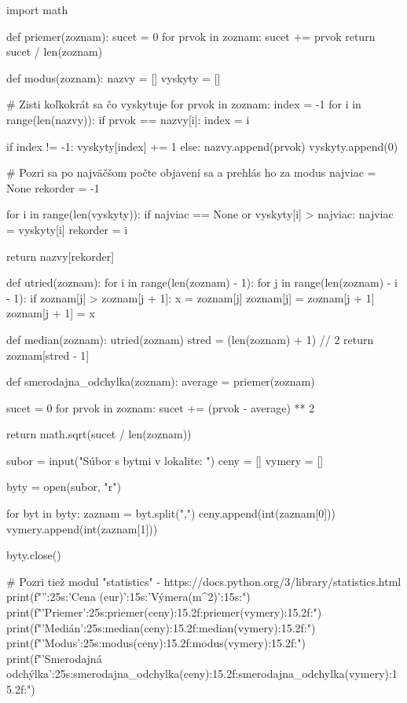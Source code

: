 \begin{solution}
import math

def priemer(zoznam):
    sucet = 0
    for prvok in zoznam:
        sucet += prvok
    return sucet / len(zoznam)

def modus(zoznam):
    nazvy = []
    vyskyty = []

    # Zisti koľkokrát sa čo vyskytuje
    for prvok in zoznam:
        index = -1
        for i in range(len(nazvy)):
            if prvok == nazvy[i]:
                index = i

        if index != -1:
            vyskyty[index] += 1
        else:
            nazvy.append(prvok)
            vyskyty.append(0)

    # Pozri sa po najväčšom počte objavení sa a prehlás ho za modus
    najviac = None
    rekorder = -1

    for i in range(len(vyskyty)):
        if najviac == None or vyskyty[i] > najviac:
            najviac = vyskyty[i]
            rekorder = i

    return nazvy[rekorder]

def utried(zoznam):
    for i in range(len(zoznam) - 1):
        for j in range(len(zoznam) - i - 1):
            if zoznam[j] > zoznam[j + 1]:
                x = zoznam[j]
                zoznam[j] = zoznam[j + 1]
                zoznam[j + 1] = x

def median(zoznam):
    utried(zoznam)
    stred = (len(zoznam) + 1) // 2
    return zoznam[stred - 1]

def smerodajna_odchylka(zoznam):
    average = priemer(zoznam)

    sucet = 0
    for prvok in zoznam:
        sucet += (prvok - average) ** 2

    return math.sqrt(sucet / len(zoznam))


subor = input("Súbor s bytmi v lokalite: ")
ceny = []
vymery = []

byty = open(subor, "r")

for byt in byty:
    zaznam = byt.split(",")
    ceny.append(int(zaznam[0]))
    vymery.append(int(zaznam[1]))

byty.close()

# Pozri tiež modul "statistics" - https://docs.python.org/3/library/statistics.html
print(f"{'':25s}:{'Cena (eur)':15s}:{'Výmera(m^2)':15s}:")
print(f"{'Priemer':25s}:{priemer(ceny):15.2f}:{priemer(vymery):15.2f}:")
print(f"{'Medián':25s}:{median(ceny):15.2f}:{median(vymery):15.2f}:")
print(f"{'Modus':25s}:{modus(ceny):15.2f}:{modus(vymery):15.2f}:")
print(f"{'Smerodajná odchýlka':25s}:{smerodajna_odchylka(ceny):15.2f}:{smerodajna_odchylka(vymery):15.2f}:")
\end{solution}


